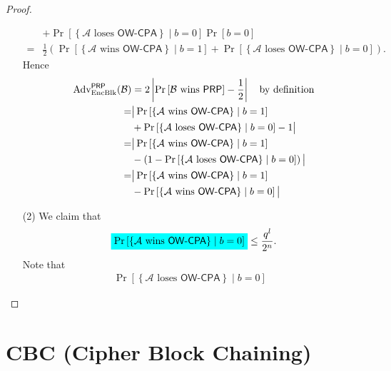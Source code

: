 \documentclass[12pt,openany]{book}
\newcommand{\mathcolorbox}[2]{\colorbox{#1}{$\displaystyle #2$}}
\theoremstyle{definition}
\newcommand{\set}[1]{\left\{#1\right\}}
\newcommand{\of}[1]{\left( #1 \right)}
\newcommand{\abs}[1]{\left\lvert #1 \right\rvert}
\newcommand{\A}{\mathcal{A}}
\newcommand{\OW}{\mathsf{OW}}
\newcommand{\PRP}{\mathsf{PRP}}
\newcommand{\CPA}{\mathsf{CPA}}
\newcommand{\Adv}{\textnormal{Adv}}
\begin{document}
\begin{proof}
\begin{enumerate}
\begin{align*}
				&+\Pr\left[\set{\text{$\A$ loses $\OW$-$\CPA$}}\mid b=0\right]\Pr[b=0]\\
				=&\frac{1}{2}\of{\Pr\left[\set{\text{$\A$ wins $\OW$-$\CPA$}}\mid b=1\right]+\Pr\left[\set{\text{$\A$ loses $\OW$-$\CPA$}}\mid b=0\right]}.
			\end{align*} Hence
			\begin{align*}
				\Adv_{\textnormal{EncBlk}}^{\PRP}(\mathcal{B})&=2\abs{\Pr\left[\text{$\mathcal{B}$ wins $\PRP$}\right]-\frac{1}{2}}\quad\text{by definition}\\
				=&\big|\Pr\left[\set{\text{$\A$ wins $\OW$-$\CPA$}}\mid b=1\right]\\
				&+\Pr\left[\set{\text{$\A$ loses $\OW$-$\CPA$}}\mid b=0\right]-1\big|\\
				=&\big|\Pr\left[\set{\text{$\A$ wins $\OW$-$\CPA$}}\mid b=1\right]\\
				&-\of{1-\Pr\left[\set{\text{$\A$ loses $\OW$-$\CPA$}}\mid b=0\right]}\big|\\
				=&\big|\Pr\left[\set{\text{$\A$ wins $\OW$-$\CPA$}}\mid b=1\right]\\
				&-\Pr\left[\set{\text{$\A$ wins $\OW$-$\CPA$}}\mid b=0\right]\big|
			\end{align*}
			\vspace{4pt}
			\item[(2)] We claim that \[
			\mathcolorbox{-red}{\Pr\left[\set{\text{$\A$ wins $\OW$-$\CPA$}}\mid b=0\right]}\leq\frac{q^l}{2^n}.
			\] Note that \begin{align*}
				\Pr[\set{\text{$\A$ loses $\OW$-$\CPA$}}\mid b=0]&
			\end{align*}
		\end{enumerate}
	\end{proof}

	\newpage
	\section{CBC (Cipher Block Chaining)}
\end{document}
